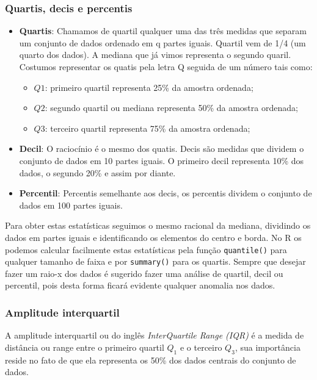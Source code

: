 \documentclass[12pt,]{style/krantz}
\providecommand{\tightlist}{%
  \setlength{\itemsep}{0pt}\setlength{\parskip}{0pt}}
\theoremstyle{definition}
\theoremstyle{definition}
\theoremstyle{definition}
\theoremstyle{remark}
\begin{document}
\hypertarget{quartis-decis-e-percentis}{%
\subsubsection{Quartis, decis e percentis}\label{quartis-decis-e-percentis}}

\begin{itemize}
\item
  \textbf{Quartis}: Chamamos de quartil qualquer uma das três medidas que separam um conjunto de dados ordenado em q partes iguais. Quartil vem de 1/4 (um quarto dos dados). A mediana que já vimos representa o segundo quaril. Costumos representar os quatis pela letra Q seguida de um número tais como:

  \begin{itemize}
  \tightlist
  \item
    \(Q1\): primeiro quartil representa 25\% da amostra ordenada;
  \item
    \(Q2\): segundo quartil ou mediana representa 50\% da amostra ordenada;
  \item
    \(Q3\): terceiro quartil representa 75\% da amostra ordenada;
  \end{itemize}
\item
  \textbf{Decil}: O raciocínio é o mesmo dos quatis. Decis são medidas que dividem o conjunto de dados em 10 partes iguais. O primeiro decil representa 10\% dos dados, o segundo 20\% e assim por diante.
\item
  \textbf{Percentil}: Percentis semelhante aos decis, os percentis dividem o conjunto de dados em 100 partes iguais.
\end{itemize}

Para obter estas estatísticas seguimos o mesmo racional da mediana, dividindo os dados em partes iguais e identificando os elementos do centro e borda. No R os podemos calcular facilmente estas estatísticas pela função \texttt{quantile()} para qualquer tamanho de faixa e por \texttt{summary()} para os quartis. Sempre que desejar fazer um raio-x dos dados é sugerido fazer uma análise de quartil, decil ou percentil, pois desta forma ficará evidente qualquer anomalia nos dados.

\hypertarget{amplitude-interquartil}{%
\subsubsection{Amplitude interquartil}\label{amplitude-interquartil}}

A amplitude interquartil ou do inglês \emph{InterQuartile Range (IQR)} é a medida de distância ou range entre o primeiro quartil \(Q_1\) e o terceiro \(Q_3\), sua importância reside no fato de que ela representa os 50\% dos dados centrais do conjunto de dados.
\end{document}
